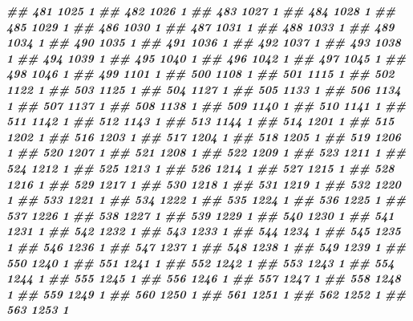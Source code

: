 \documentclass[
]{book}
\newenvironment{Shaded}{\begin{snugshade}}{\end{snugshade}}
\newcommand{\DocumentationTok}[1]{\textcolor[rgb]{0.56,0.35,0.01}{\textbf{\textit{#1}}}}
\theoremstyle{definition}
\theoremstyle{definition}
\theoremstyle{definition}
\theoremstyle{definition}
\theoremstyle{remark}
\begin{document}
\begin{Shaded}
\begin{Highlighting}[]
\DocumentationTok{\#\# 481   1025 1}
\DocumentationTok{\#\# 482   1026 1}
\DocumentationTok{\#\# 483   1027 1}
\DocumentationTok{\#\# 484   1028 1}
\DocumentationTok{\#\# 485   1029 1}
\DocumentationTok{\#\# 486   1030 1}
\DocumentationTok{\#\# 487   1031 1}
\DocumentationTok{\#\# 488   1033 1}
\DocumentationTok{\#\# 489   1034 1}
\DocumentationTok{\#\# 490   1035 1}
\DocumentationTok{\#\# 491   1036 1}
\DocumentationTok{\#\# 492   1037 1}
\DocumentationTok{\#\# 493   1038 1}
\DocumentationTok{\#\# 494   1039 1}
\DocumentationTok{\#\# 495   1040 1}
\DocumentationTok{\#\# 496   1042 1}
\DocumentationTok{\#\# 497   1045 1}
\DocumentationTok{\#\# 498   1046 1}
\DocumentationTok{\#\# 499   1101 1}
\DocumentationTok{\#\# 500   1108 1}
\DocumentationTok{\#\# 501   1115 1}
\DocumentationTok{\#\# 502   1122 1}
\DocumentationTok{\#\# 503   1125 1}
\DocumentationTok{\#\# 504   1127 1}
\DocumentationTok{\#\# 505   1133 1}
\DocumentationTok{\#\# 506   1134 1}
\DocumentationTok{\#\# 507   1137 1}
\DocumentationTok{\#\# 508   1138 1}
\DocumentationTok{\#\# 509   1140 1}
\DocumentationTok{\#\# 510   1141 1}
\DocumentationTok{\#\# 511   1142 1}
\DocumentationTok{\#\# 512   1143 1}
\DocumentationTok{\#\# 513   1144 1}
\DocumentationTok{\#\# 514   1201 1}
\DocumentationTok{\#\# 515   1202 1}
\DocumentationTok{\#\# 516   1203 1}
\DocumentationTok{\#\# 517   1204 1}
\DocumentationTok{\#\# 518   1205 1}
\DocumentationTok{\#\# 519   1206 1}
\DocumentationTok{\#\# 520   1207 1}
\DocumentationTok{\#\# 521   1208 1}
\DocumentationTok{\#\# 522   1209 1}
\DocumentationTok{\#\# 523   1211 1}
\DocumentationTok{\#\# 524   1212 1}
\DocumentationTok{\#\# 525   1213 1}
\DocumentationTok{\#\# 526   1214 1}
\DocumentationTok{\#\# 527   1215 1}
\DocumentationTok{\#\# 528   1216 1}
\DocumentationTok{\#\# 529   1217 1}
\DocumentationTok{\#\# 530   1218 1}
\DocumentationTok{\#\# 531   1219 1}
\DocumentationTok{\#\# 532   1220 1}
\DocumentationTok{\#\# 533   1221 1}
\DocumentationTok{\#\# 534   1222 1}
\DocumentationTok{\#\# 535   1224 1}
\DocumentationTok{\#\# 536   1225 1}
\DocumentationTok{\#\# 537   1226 1}
\DocumentationTok{\#\# 538   1227 1}
\DocumentationTok{\#\# 539   1229 1}
\DocumentationTok{\#\# 540   1230 1}
\DocumentationTok{\#\# 541   1231 1}
\DocumentationTok{\#\# 542   1232 1}
\DocumentationTok{\#\# 543   1233 1}
\DocumentationTok{\#\# 544   1234 1}
\DocumentationTok{\#\# 545   1235 1}
\DocumentationTok{\#\# 546   1236 1}
\DocumentationTok{\#\# 547   1237 1}
\DocumentationTok{\#\# 548   1238 1}
\DocumentationTok{\#\# 549   1239 1}
\DocumentationTok{\#\# 550   1240 1}
\DocumentationTok{\#\# 551   1241 1}
\DocumentationTok{\#\# 552   1242 1}
\DocumentationTok{\#\# 553   1243 1}
\DocumentationTok{\#\# 554   1244 1}
\DocumentationTok{\#\# 555   1245 1}
\DocumentationTok{\#\# 556   1246 1}
\DocumentationTok{\#\# 557   1247 1}
\DocumentationTok{\#\# 558   1248 1}
\DocumentationTok{\#\# 559   1249 1}
\DocumentationTok{\#\# 560   1250 1}
\DocumentationTok{\#\# 561   1251 1}
\DocumentationTok{\#\# 562   1252 1}
\DocumentationTok{\#\# 563   1253 1}


\end{Highlighting}
\end{Shaded}
\end{document}
